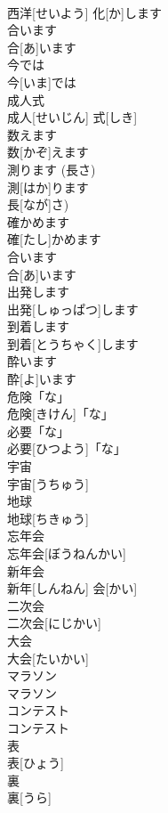 \documentclass[8pt]{extreport}
\begin{document}
\begin{CJK}{UTF8}{min}
\\	西洋[せいよう] 化[か]します	
\\	合います	
\\	合[あ]います	
\\	今では	
\\	今[いま]では	
\\	成人式	
\\	成人[せいじん] 式[しき]	
\\	数えます	
\\	数[かぞ]えます	
\\	測ります (長さ)	
\\	測[はか]ります 
\\	長[なが]さ)	
\\	確かめます	
\\	確[たし]かめます	
\\	合います	
\\	合[あ]います	
\\	出発します	
\\	出発[しゅっぱつ]します	
\\	到着します	
\\	到着[とうちゃく]します	
\\	酔います	
\\	酔[よ]います	
\\	危険「な」	
\\	危険[きけん]「な」	
\\	必要「な」	
\\	必要[ひつよう]「な」	
\\	宇宙	
\\	宇宙[うちゅう]	
\\	地球	
\\	地球[ちきゅう]	
\\	忘年会	
\\	忘年会[ぼうねんかい]	
\\	新年会	
\\	新年[しんねん] 会[かい]	
\\	二次会	
\\	二次会[にじかい]	
\\	大会	
\\	大会[たいかい]	
\\	マラソン	
\\	マラソン	
\\	コンテスト	
\\	コンテスト	
\\	表	
\\	表[ひょう]	
\\	裏	
\\	裏[うら]	

\end{CJK}
\end{document}
